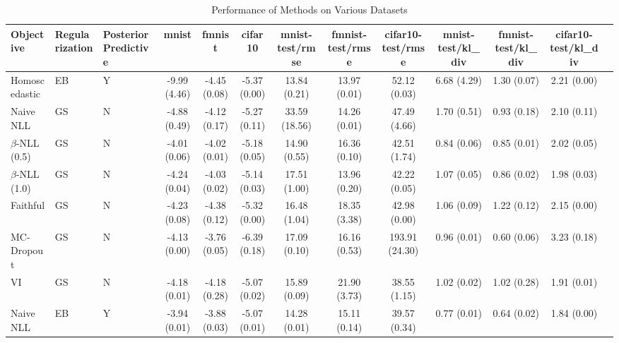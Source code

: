 \begin{table}
\centering
\caption{Performance of Methods on Various Datasets}
\label{tab:results}
\begin{tabular}{|l|l|l|c|c|c|c|c|c|c|c|c|c|}
\toprule
        Objective & Regularization & Posterior Predictive &        mnist &       fmnist &      cifar10 & mnist-test/rmse & fmnist-test/rmse & cifar10-test/rmse & mnist-test/kl_div & fmnist-test/kl_div & cifar10-test/kl_div \\
\midrule
    Homoscedastic &             EB &                    Y & -9.99 (4.46) & -4.45 (0.08) & -5.37 (0.00) &    13.84 (0.21) &     13.97 (0.01) &      52.12 (0.03) &       6.68 (4.29) &        1.30 (0.07) &         2.21 (0.00) \\
        Naive NLL &             GS &                    N & -4.88 (0.49) & -4.12 (0.17) & -5.27 (0.11) &   33.59 (18.56) &     14.26 (0.01) &      47.49 (4.66) &       1.70 (0.51) &        0.93 (0.18) &         2.10 (0.11) \\
$\beta$-NLL (0.5) &             GS &                    N & -4.01 (0.06) & -4.02 (0.01) & -5.18 (0.05) &    14.90 (0.55) &     16.36 (0.10) &      42.51 (1.74) &       0.84 (0.06) &        0.85 (0.01) &         2.02 (0.05) \\
$\beta$-NLL (1.0) &             GS &                    N & -4.24 (0.04) & -4.03 (0.02) & -5.14 (0.03) &    17.51 (1.00) &     13.96 (0.20) &      42.22 (0.05) &       1.07 (0.05) &        0.86 (0.02) &         1.98 (0.03) \\
         Faithful &             GS &                    N & -4.23 (0.08) & -4.38 (0.12) & -5.32 (0.00) &    16.48 (1.04) &     18.35 (3.38) &      42.98 (0.00) &       1.06 (0.09) &        1.22 (0.12) &         2.15 (0.00) \\
       MC-Dropout &             GS &                    N & -4.13 (0.00) & -3.76 (0.05) & -6.39 (0.18) &    17.09 (0.10) &     16.16 (0.53) &    193.91 (24.30) &       0.96 (0.01) &        0.60 (0.06) &         3.23 (0.18) \\
               VI &             GS &                    N & -4.18 (0.01) & -4.18 (0.28) & -5.07 (0.02) &    15.89 (0.09) &     21.90 (3.73) &      38.55 (1.15) &       1.02 (0.02) &        1.02 (0.28) &         1.91 (0.01) \\
        Naive NLL &             EB &                    Y & -3.94 (0.01) & -3.88 (0.03) & -5.07 (0.01) &    14.28 (0.01) &     15.11 (0.14) &      39.57 (0.34) &       0.77 (0.01) &        0.64 (0.02) &         1.84 (0.00) \\

\end{tabular}
\end{table}
